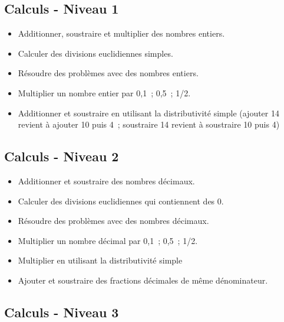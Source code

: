\documentclass[a4paper,12pt,fleqn]{article}	
\begin{document}
\renewcommand{\labelitemi}{}

\subsection*{Calculs - Niveau 1}

\begin{itemize}
	\item {}Additionner, soustraire et multiplier des nombres entiers.
	\item {}Calculer des divisions euclidiennes simples.
	\item {}Résoudre des problèmes avec des nombres entiers.
	\item {}Multiplier un nombre entier par 0,1 ; 0,5 ; 1/2.
	\item {}Additionner et soustraire en utilisant la distributivité simple (ajouter 14 revient à ajouter 10 puis 4 ; soustraire 14 revient à soustraire 10 puis 4)

\end{itemize}

\subsection*{Calculs - Niveau 2}

\begin{itemize}
	\item {}Additionner et soustraire des nombres décimaux.
	\item {}Calculer des divisions euclidiennes qui contiennent des 0.
	\item {}Résoudre des problèmes avec des nombres décimaux.
	\item {}Multiplier un nombre décimal par 0,1 ; 0,5 ; 1/2.
	\item {}Multiplier en utilisant la distributivité simple %
	\item {}Ajouter et soustraire des fractions décimales de même dénominateur.

\end{itemize}

\subsection*{Calculs - Niveau 3}
\end{document}
